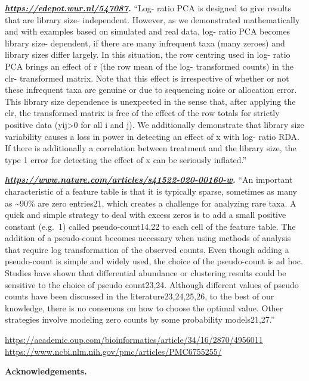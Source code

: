 \documentclass[
]{article}
\begin{document}
\textbf{\emph{\url{https://edepot.wur.nl/547087}.}} ``Log- ratio PCA is
designed to give results that are library size- independent. However, as
we demonstrated mathematically and with examples based on simulated and
real data, log- ratio PCA becomes library size- dependent, if there are
many infrequent taxa (many zeroes) and library sizes differ largely. In
this situation, the row centring used in log- ratio PCA brings an effect
of r (the row mean of the log- transformed counts) in the clr-
transformed matrix. Note that this effect is irrespective of whether or
not these infrequent taxa are genuine or due to sequencing noise or
allocation error. This library size dependence is unexpected in the
sense that, after applying the clr, the transformed matrix is free of
the effect of the row totals for strictly positive data
(yij\textgreater0 for all i and j). We additionally demonstrate that
library size variability causes a loss in power in detecting an effect
of x with log- ratio RDA. If there is additionally a correlation between
treatment and the library size, the type 1 error for detecting the
effect of x can be seriously inflated.''

\textbf{\emph{\url{https://www.nature.com/articles/s41522-020-00160-w}.}}
``An important characteristic of a feature table is that it is typically
sparse, sometimes as many as \textasciitilde90\% are zero entries21,
which creates a challenge for analyzing rare taxa. A quick and simple
strategy to deal with excess zeros is to add a small positive constant
(e.g.~1) called pseudo-count14,22 to each cell of the feature table. The
addition of a pseudo-count becomes necessary when using methods of
analysis that require log transformation of the observed counts. Even
though adding a pseudo-count is simple and widely used, the choice of
the pseudo-count is ad hoc. Studies have shown that differential
abundance or clustering results could be sensitive to the choice of
pseudo count23,24. Although different values of pseudo counts have been
discussed in the literature23,24,25,26, to the best of our knowledge,
there is no consensus on how to choose the optimal value. Other
strategies involve modeling zero counts by some probability
models21,27.''

\url{https://academic.oup.com/bioinformatics/article/34/16/2870/4956011}
\url{https://www.ncbi.nlm.nih.gov/pmc/articles/PMC6755255/}
\vspace{10mm}

\textbf{Acknowledgements.}

\newpage
\end{document}
